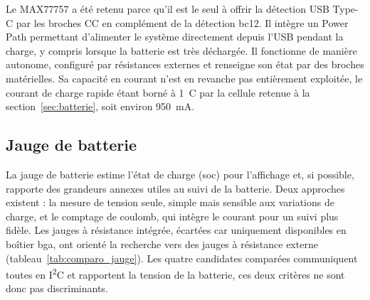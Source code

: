 Le MAX77757 a été retenu parce qu'il est le seul à offrir la détection USB Type-C par les broches CC en complément de la détection \gls{bc12}. Il intègre un Power Path permettant d'alimenter le système directement depuis l'USB pendant la charge, y compris lorsque la batterie est très déchargée. Il fonctionne de manière autonome, configuré par résistances externes et renseigne son état par des broches matérielles. Sa capacité en courant n'est en revanche pas entièrement exploitée, le courant de charge rapide étant borné à 1~C par la cellule retenue à la section~\ref{sec:batterie}, soit environ 950~mA.






\subsection{Jauge de batterie}

La jauge de batterie estime l'état de charge (\gls{soc}) pour l'affichage et, si possible, rapporte des grandeurs annexes utiles au suivi de la batterie. Deux approches existent : la mesure de tension seule, simple mais sensible aux variations de charge, et le comptage de coulomb, qui intègre le courant pour un suivi plus fidèle. Les jauges à résistance intégrée, écartées car uniquement disponibles en boîtier \gls{bga}, ont orienté la recherche vers des jauges à résistance externe (tableau~\ref{tab:comparo_jauge}). Les quatre candidates comparées communiquent toutes en I\textsuperscript{2}C et rapportent la tension de la batterie, ces deux critères ne sont donc pas discriminants.

